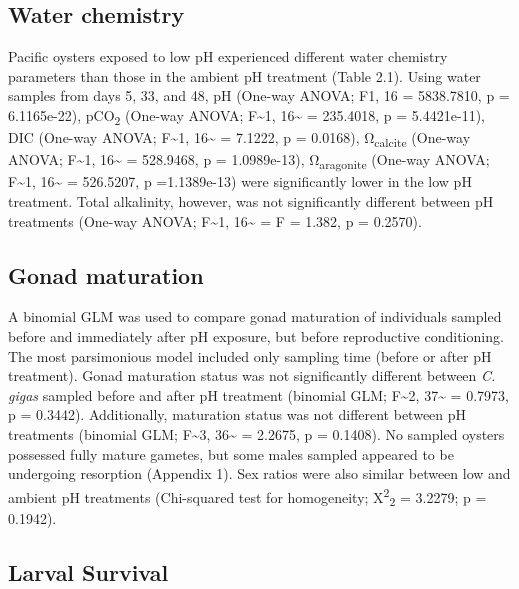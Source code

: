 \documentclass [11pt, proquest] {uwthesis}[2015/03/03]
\begin{document}
\hypertarget{water-chemistry}{%
\subsection{Water chemistry}\label{water-chemistry}}

Pacific oysters exposed to low pH experienced different water chemistry parameters than those in the ambient pH treatment (Table 2.1). Using water samples from days 5, 33, and 48, pH (One-way ANOVA; F1, 16 = 5838.7810, p = 6.1165e-22), pCO\textsubscript{2} (One-way ANOVA; F\textasciitilde1, 16\textasciitilde{} = 235.4018, p = 5.4421e-11), DIC (One-way ANOVA; F\textasciitilde1, 16\textasciitilde{} = 7.1222, p = 0.0168), Ω\textsubscript{calcite} (One-way ANOVA; F\textasciitilde1, 16\textasciitilde{} = 528.9468, p = 1.0989e-13), Ω\textsubscript{aragonite} (One-way ANOVA; F\textasciitilde1, 16\textasciitilde{} = 526.5207, p =1.1389e-13) were significantly lower in the low pH treatment. Total alkalinity, however, was not significantly different between pH treatments (One-way ANOVA; F\textasciitilde1, 16\textasciitilde{} = F = 1.382, p = 0.2570).

\hypertarget{gonad-maturation}{%
\subsection{Gonad maturation}\label{gonad-maturation}}

A binomial GLM was used to compare gonad maturation of individuals sampled before and immediately after pH exposure, but before reproductive conditioning. The most parsimonious model included only sampling time (before or after pH treatment). Gonad maturation status was not significantly different between \emph{C. gigas} sampled before and after pH treatment (binomial GLM; F\textasciitilde2, 37\textasciitilde{} = 0.7973, p = 0.3442). Additionally, maturation status was not different between pH treatments (binomial GLM; F\textasciitilde3, 36\textasciitilde{} = 2.2675, p = 0.1408). No sampled oysters possessed fully mature gametes, but some males sampled appeared to be undergoing resorption (Appendix 1). Sex ratios were also similar between low and ambient pH treatments (Chi-squared test for homogeneity; X\textsuperscript{2}\textsubscript{2} = 3.2279; p = 0.1942).

\hypertarget{larval-survival}{%
\subsection{Larval Survival}\label{larval-survival}}
\end{document}
